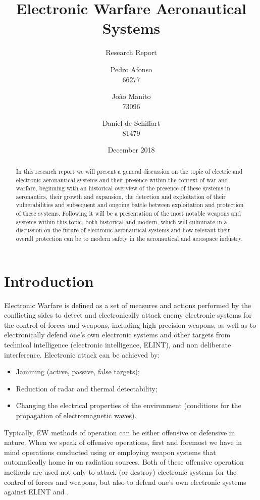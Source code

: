 \documentclass[english,purist]{ist-report}
\author{Pedro Afonso \\ 66277 \and João Manito \\ 73096 \and Daniel de Schiffart \\ 81479}
\title{Electronic Warfare Aeronautical Systems}
\subtitle{Research Report}
\date{December 2018}
\begin{document}
\makecover{}

\begin{abstract}
	In this research report we will present a general discussion on the topic of electric and electronic aeronautical systems and their presence within the context of war and warfare, beginning with an historical overview of the presence of these systems in aeronautics, their growth and expansion, the detection and exploitation of their vulnerabilities and subsequent and ongoing battle between exploitation and protection of these systems. Following it will be a presentation of the most notable weapons and systems within this topic, both historical and modern, which will culminate in a discussion on the future of electronic aeronautical systems and how relevant their overall protection can be to modern safety in the aeronautical and aerospace industry.
\end{abstract}

{ \tableofcontents}

\pagebreak

\section{Introduction}\label{sec:introduction}
Electronic Warfare is defined as a set of measures and actions
performed by the conflicting sides to detect and electronically attack enemy electronic systems for the control of forces and weapons, including high precision weapons, as well as to electronically defend one's own electronic systems and other targets from technical intelligence (electronic intelligence, ELINT), \jamming{} and non deliberate interference.  
Electronic attack can be achieved by:
\begin{itemize}
    \item Jamming (active, passive, false targets);
    \item Reduction of radar and thermal detectability;
    \item Changing the electrical properties of the environment (conditions
for the propagation of electromagnetic waves). 
\end{itemize}

Typically, EW methods of operation can be either offensive or
defensive in nature. When we speak of offensive operations, first and
foremost we have in mind operations conducted using \jamming{} or employing weapon systems that automatically home in on radiation sources. Both of these offensive operation methods are used not only to attack (or destroy) electronic systems for the control of forces and weapons, but also to defend one's own electronic systems against ELINT and \jamming{}.
\end{document}
